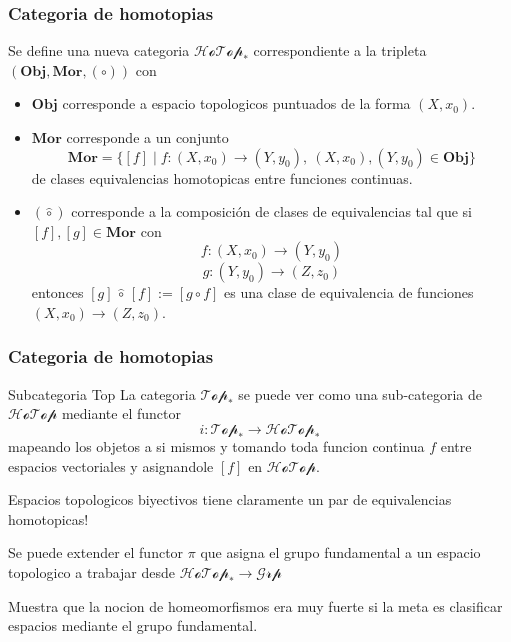 \documentclass[xetex,mathserif,serif]{beamer}
\begin{document}
  \begin{frame}
    \frametitle{Categoria de homotopias}
    Se define una nueva categoria \(\mathscr{HoTop}_*\) correspondiente
    a la tripleta \(\left( \mathbf{Obj}, \mathbf{Mor}, (\circ) \right)\)
    con
    \begin{itemize}
    \item \(\mathbf {Obj}\) corresponde a espacio topologicos puntuados de la
      forma \((X, x_0)\).
    \item \(\mathbf {Mor}\) corresponde a un conjunto
      \[ \mathbf{Mor} = \{ [f] \mid f : (X,x_0) \to (Y,y_0),\
        (X,x_0),(Y,y_0) \in \mathbf {Obj} \}\]
      de clases equivalencias homotopicas entre funciones continuas.
    \item \((\hat \circ)\) corresponde a la composición de clases de
      equivalencias tal que si \([f] , [g] \in \mathbf {Mor} \) con
      \[ f : (X,x_0) \to (Y, y_0)\]
      \[ g : (Y, y_0) \to (Z, z_0)\]
      entonces \([g] \, \hat \circ \, [f] := [ g \circ f ] \) es una clase
      de equivalencia de funciones \((X, x_0) \to (Z, z_0)\).
    \end{itemize}
  \end{frame}
  \begin{frame}
    \frametitle{Categoria de homotopias}
    \begin{block}{Subcategoria Top}
      La categoria \(\mathscr{Top}_*\) se puede ver como una
      sub-categoria de \(\mathscr{HoTop}\) mediante el functor
      \[ i : \mathscr{Top}_* \to \mathscr{HoTop}_*\]
      mapeando los objetos a si mismos y tomando toda funcion continua
      \(f\) entre espacios vectoriales y asignandole \([f]\) en
      \(\mathscr{HoTop}\).

      Espacios topologicos biyectivos tiene claramente un par de
      equivalencias homotopicas!

      Se puede extender el functor \(\pi\) que asigna el grupo
      fundamental a un espacio topologico a trabajar desde
      \(\mathscr{HoTop}_* \to \mathscr{Grp}\)

      Muestra que la nocion de homeomorfismos era muy fuerte si la meta
      es clasificar espacios mediante el grupo fundamental.
    \end{block}
  \end{frame}
\end{document}
